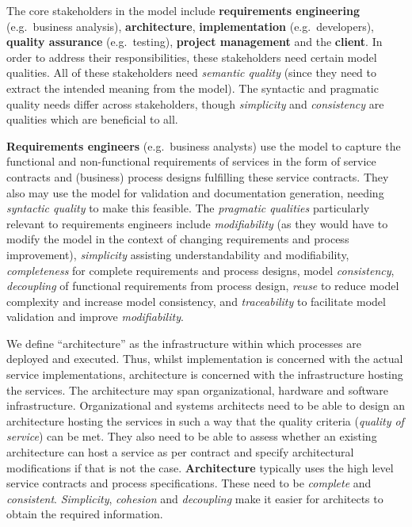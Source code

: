 The core stakeholders in the model include {\bf requirements engineering} (e.g.\ business analysis), {\bf architecture}, {\bf implementation} (e.g.\ developers), {\bf quality assurance} (e.g.\ testing), {\bf project management} and the {\bf client}. In order to address their responsibilities, these stakeholders need certain model qualities. All of these stakeholders need \emph{semantic quality} (since they need to extract the intended meaning from the model). The syntactic and pragmatic quality needs differ across stakeholders, though \emph{simplicity} and \emph{consistency} are qualities which are beneficial to all.

{\bf Requirements engineers} (e.g.\ business analysts) use the model to capture the functional and non-functional requirements of services in the form of service contracts and (business) process designs fulfilling these service contracts. They also may use the model for validation and documentation generation, needing \emph{syntactic quality} to make this feasible.  The \emph{pragmatic qualities} particularly relevant to requirements engineers include \emph{modifiability} (as they would have to modify the model in the context of changing requirements and process improvement), \emph{simplicity} assisting understandability and modifiability, \emph{completeness} for complete requirements and process designs, model \emph{consistency}, \emph{decoupling} of functional requirements from process design, \emph{reuse} to reduce model complexity and increase model consistency, and \emph{traceability} to facilitate model validation and improve \emph{modifiability}. 

We define ``architecture'' as the infrastructure within which processes are deployed and executed. Thus, whilst implementation is concerned with the actual service implementations, architecture is concerned with the infrastructure hosting the services. The architecture may span organizational, hardware and software infrastructure. Organizational and systems architects need to be able to design an architecture hosting the services in such a way that the quality criteria (\emph{quality of service}) can be met. They also need to be able to assess whether an existing architecture can host a service as per contract and specify architectural modifications if that is not the case. {\bf Architecture} typically uses the high level service contracts and process specifications. These need to be \emph{complete} and \emph{consistent}. \emph{Simplicity}, \emph{cohesion} and \emph{decoupling} make it easier for architects to obtain the required information.

